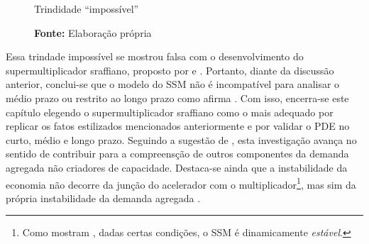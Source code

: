 \begin{figure}[htb]
	\caption{Trindidade ``impossível''}
	\label{diagrama}
	\begin{center}
	\end{center}
	\caption*{\textbf{Fonte:} Elaboração própria}
\end{figure}
\noindent Essa trindade impossível se mostrou falsa com o desenvolvimento do supermultiplicador sraffiano, proposto por \textcite{serrano_long_1995} e \textcite{bortis_institutions_1996}. Portanto, diante da discussão anterior, conclui-se que o modelo do SSM não é incompatível para analisar o médio prazo ou restrito ao longo prazo como afirma \textcite{nikiforos_comments_2018}. Com isso, encerra-se este capítulo elegendo o supermultiplicador sraffiano como o mais adequado por replicar os fatos estilizados mencionados anteriormente e por validar o PDE no curto, médio e longo prazo. Seguindo a sugestão de \textcite[p.~280]{freitas_growth_2015}, esta investigação avança no sentido de contribuir para a compreensção de outros componentes da demanda agregada não criadores de capacidade. Destaca-se ainda que a instabilidade da economia não decorre da junção do acelerador com o multiplicador\footnote{Como mostram \textcite{serrano_trouble_2017}, dadas certas condições, o SSM é dinamicamente \textit{estável}.}, mas sim da própria instabilidade da demanda agregada \cite{dejuan_hidden_2017}.
